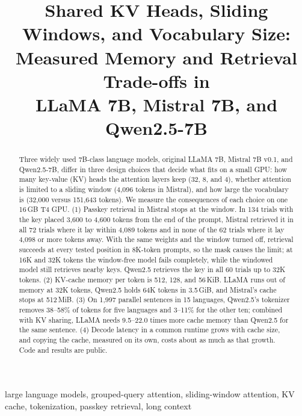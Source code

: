 \documentclass[conference]{IEEEtran}
\begin{document}
\title{Shared KV Heads, Sliding Windows, and Vocabulary Size:\\Measured Memory and Retrieval Trade-offs in\\LLaMA 7B, Mistral 7B, and Qwen2.5-7B}

\author{
\and
{}
\and
{}
}
\maketitle
\begin{abstract}
Three widely used 7B-class language models, original LLaMA 7B, Mistral 7B v0.1, and Qwen2.5-7B, differ in three design choices that decide what fits on a small GPU: how many key-value (KV) heads the attention layers keep (32, 8, and 4), whether attention is limited to a sliding window (4,096 tokens in Mistral), and how large the vocabulary is (32,000 versus 151,643 tokens). We measure the consequences of each choice on one 16\,GB T4 GPU. (1) Passkey retrieval in Mistral stops at the window. In 134 trials with the key placed 3,600 to 4,600 tokens from the end of the prompt, Mistral retrieved it in all 72 trials where it lay within 4,089 tokens and in none of the 62 trials where it lay 4,098 or more tokens away. With the same weights and the window turned off, retrieval succeeds at every tested position in 8K-token prompts, so the mask causes the limit; at 16K and 32K tokens the window-free model fails completely, while the windowed model still retrieves nearby keys. Qwen2.5 retrieves the key in all 60 trials up to 32K tokens. (2) KV-cache memory per token is 512, 128, and 56\,KiB. LLaMA runs out of memory at 32K tokens, Qwen2.5 holds 64K tokens in 3.5\,GiB, and Mistral's cache stops at 512\,MiB. (3) On 1,997 parallel sentences in 15 languages, Qwen2.5's tokenizer removes 38--58\% of tokens for five languages and 3--11\% for the other ten; combined with KV sharing, LLaMA needs 9.5--22.0 times more cache memory than Qwen2.5 for the same sentence. (4) Decode latency in a common runtime grows with cache size, and copying the cache, measured on its own, costs about as much as that growth. Code and results are public.
\end{abstract}

\begin{IEEEkeywords}
large language models, grouped-query attention, sliding-window attention, KV cache, tokenization, passkey retrieval, long context
\end{IEEEkeywords}
\end{document}
